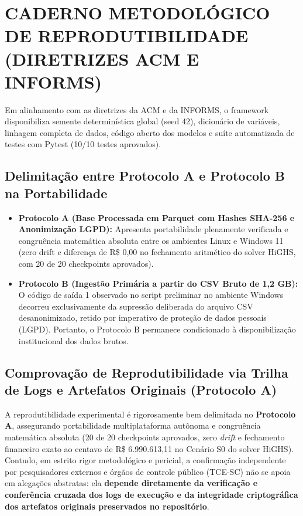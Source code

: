 \chapter{CADERNO METODOLÓGICO DE REPRODUTIBILIDADE (DIRETRIZES ACM E INFORMS)}
\label{apendice:c}

Em alinhamento com as diretrizes da ACM e da INFORMS, o framework disponibiliza semente determinística global (seed 42), dicionário de variáveis, linhagem completa de dados, código aberto dos modelos e suíte automatizada de testes com Pytest (10/10 testes aprovados).

\section{Delimitação entre Protocolo A e Protocolo B na Portabilidade}

\begin{itemize}
    \item \textbf{Protocolo A (Base Processada em Parquet com Hashes SHA-256 e Anonimização LGPD):} Apresenta portabilidade plenamente verificada e congruência matemática absoluta entre os ambientes Linux e Windows 11 (zero drift e diferença de R\$ 0,00 no fechamento aritmético do solver HiGHS, com 20 de 20 checkpoints aprovados).
    \item \textbf{Protocolo B (Ingestão Primária a partir do CSV Bruto de 1,2 GB):} O código de saída 1 observado no script preliminar no ambiente Windows decorreu exclusivamente da supressão deliberada do arquivo CSV desanonimizado, retido por imperativo de proteção de dados pessoais (LGPD). Portanto, o Protocolo B permanece condicionado à disponibilização institucional dos dados brutos.
\end{itemize}

\section{Comprovação de Reprodutibilidade via Trilha de Logs e Artefatos Originais (Protocolo A)}

A reprodutibilidade experimental é rigorosamente bem delimitada no \textbf{Protocolo A}, assegurando portabilidade multiplataforma autônoma e congruência matemática absoluta (20 de 20 checkpoints aprovados, zero \textit{drift} e fechamento financeiro exato ao centavo de R\$ 6.990.613,11 no Cenário S0 do solver HiGHS). Contudo, em estrito rigor metodológico e pericial, a confirmação independente por pesquisadores externos e órgãos de controle público (TCE-SC) não se apoia em alegações abstratas: ela \textbf{depende diretamente da verificação e conferência cruzada dos logs de execução e da integridade criptográfica dos artefatos originais preservados no repositório}.

